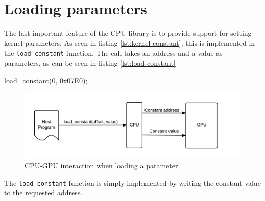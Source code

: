 \section{Loading parameters}
The last important feature of the CPU library is to provide support for setting kernel parameters.
As seen in listing \ref{lst:kernel-constant}, this is implemented in the \verb/load_constant/ function.
The call takes an address and a value as parameters, as can be seen in listing \ref{lst:load-constant}

\begin{c-code}[caption=Setting a kernel parameter, label=lst:load-constant]
load_constant(0, 0x07E0);
\end{c-code}

\begin{figure}[H]
    \centering
    \includegraphics[width=\textwidth]{../cpu/diagrams/loading_a_constant.png}
    \caption{CPU-GPU interaction when loading a parameter.}
    \label{fig:loading_a_constant}
\end{figure}

The \verb/load_constant/ function is simply implemented by writing the constant value to the requested address.
